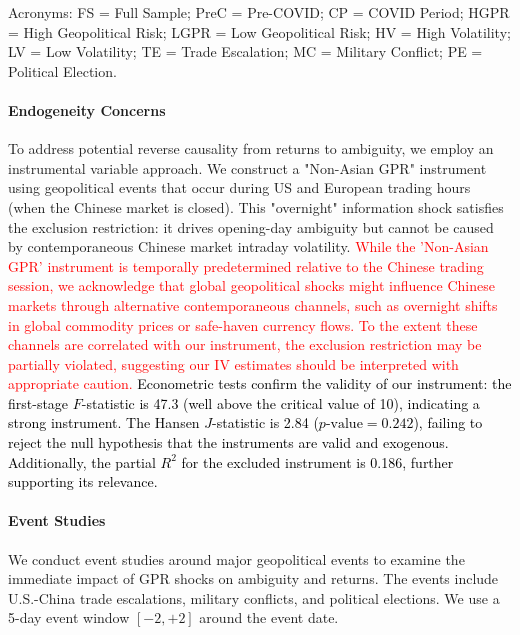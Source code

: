\documentclass[preprint,12pt,authoryear]{elsarticle}
\begin{document}
\begin{table}[htbp]
\begin{threeparttable}
\begin{tablenotes}[flushleft]
\item[] Acronyms: FS = Full Sample; PreC = Pre-COVID; CP = COVID Period; HGPR = High Geopolitical Risk; LGPR = Low Geopolitical Risk; HV = High Volatility; LV = Low Volatility; TE = Trade Escalation; MC = Military Conflict; PE = Political Election.
\end{tablenotes}
\end{threeparttable}
\end{table}

\paragraph{Endogeneity Concerns} To address potential reverse causality from returns to ambiguity, we employ an instrumental variable approach. We construct a "Non-Asian GPR" instrument using geopolitical events that occur during US and European trading hours (when the Chinese market is closed). This "overnight" information shock satisfies the exclusion restriction: it drives opening-day ambiguity but cannot be caused by contemporaneous Chinese market intraday volatility. \textcolor{red}{While the 'Non-Asian GPR' instrument is temporally predetermined relative to the Chinese trading session, we acknowledge that global geopolitical shocks might influence Chinese markets through alternative contemporaneous channels, such as overnight shifts in global commodity prices or safe-haven currency flows. To the extent these channels are correlated with our instrument, the exclusion restriction may be partially violated, suggesting our IV estimates should be interpreted with appropriate caution.} \textcolor{black}{Econometric tests confirm the validity of our instrument: the first-stage $F$-statistic is 47.3 (well above the critical value of 10), indicating a strong instrument. The Hansen $J$-statistic is 2.84 ($p\text{-value} = 0.242$), failing to reject the null hypothesis that the instruments are valid and exogenous. Additionally, the partial $R^2$ for the excluded instrument is 0.186, further supporting its relevance.}

\paragraph{Event Studies} We conduct event studies around major geopolitical events to examine the immediate impact of GPR shocks on ambiguity and returns. The events include U.S.-China trade escalations, military conflicts, and political elections. We use a 5-day event window $[-2, +2]$ around the event date.
\end{document}
